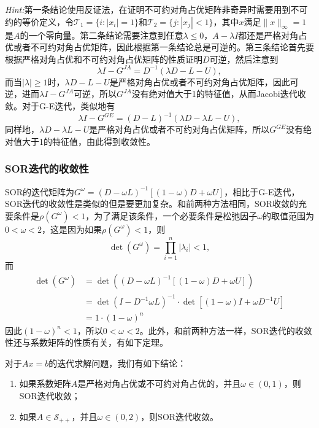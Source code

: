 \documentclass[a4paper,10pt]{ctexart}
\begin{document}
\noindent \emph{Hint:}第一条结论使用反证法，在证明不可约对角占优矩阵非奇异时需要用到不可约的等价定义，令$ \mathcal{T}_1= \{i:|x_i|=1\} $和$ \mathcal{T}_2 = \{j:|x_j|<1\} $，其中$ x $满足$ \| x \|_\infty = 1 $是$ A $的一个零向量。第二条结论需要注意到任意$ \lambda\leqslant 0 $，$ A-\lambda I $都还是严格对角占优或者不可约对角占优矩阵，因此根据第一条结论总是可逆的。第三条结论首先要根据严格对角占优和不可约对角占优矩阵的性质证明$ D $可逆，然后注意到
\[
    \lambda I - G^{JA} = D^{-1}(\lambda D - L-U),
\]
而当$ |\lambda|\geqslant 1 $时，$ \lambda D - L-U $是严格对角占优或者不可约对角占优矩阵，因此可逆，进而$ \lambda I - G^{JA} $可逆，所以$ G^{JA} $没有绝对值大于1的特征值，从而Jacobi迭代收敛。对于G-E迭代，类似地有
\[
    \lambda I - G^{GE} = (D-L)^{-1}(\lambda D - \lambda L-U),
\]
同样地，$ \lambda D - \lambda L-U $是严格对角占优或者不可约对角占优矩阵，所以$ G^{GE} $没有绝对值大于1的特征值，由此得到收敛性。

\subsubsection{SOR迭代的收敛性}
SOR的迭代矩阵为$ G^{\omega} = (D-\omega L)^{-1}[(1-\omega) D + \omega U] $，相比于G-E迭代，SOR迭代的收敛性是类似的但是要更加复杂。和前两种方法相同，SOR收敛的充要条件是$ \rho(G^{\omega})<1 $，为了满足该条件，一个必要条件是松弛因子$ \omega $的取值范围为$ 0<\omega<2 $，这是因为如果$ \rho(G^{\omega})<1 $，则
\[
    \det(G^\omega) = \prod_{i=1}^n |\lambda_i| <1,
\]
而
\[
    \begin{aligned}
        \det(G^\omega) &=\det((D-\omega L)^{-1}[(1-\omega) D + \omega U])\\
        &= \det(I-D^{-1}\omega L)^{-1}\cdot \det[(1-\omega)I + \omega D^{-1} U]\\
        &= 1\cdot (1-\omega)^n
    \end{aligned}
\]
因此$ (1-\omega)^n<1 $，所以$ 0<\omega<2 $。此外，和前两种方法一样，SOR迭代的收敛性还与系数矩阵的性质有关，有如下定理。
\begin{theorem}
    对于$ Ax=b $的迭代求解问题，我们有如下结论：
    \begin{enumerate}
        \item 如果系数矩阵$ A $是严格对角占优或不可约对角占优的，并且$ \omega\in (0,1) $，则SOR迭代收敛；
        \item 如果$ A\in \mathcal{S}_{++} $，并且$ \omega\in (0,2) $，则SOR迭代收敛。
    \end{enumerate}
\end{theorem}
\end{document}
